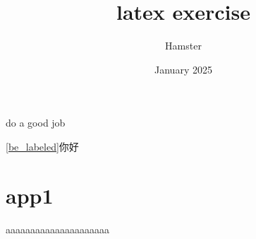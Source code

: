 \documentclass{ctexart}
\title{latex exercise}
\author{Hamster}
\date{January 2025}
\begin{document}
\maketitle

\tableofcontents

do a good job\label{be_labeled}



\ref{be_labeled}你好

\appendix
\section{app1}
aaaaaaaaaaaaaaaaaaaaa
\end{document}
